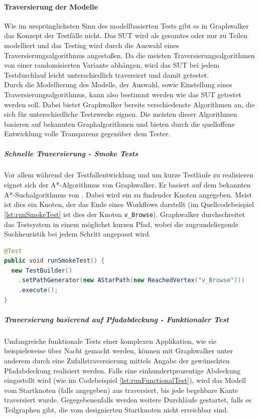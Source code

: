 \paragraph{Traversierung der Modelle} 
\label{sec:graphwalker_traversierung} 
Wie im ursprünglichsten Sinn des modellbasierten Tests gibt es in Graphwalker das Konzept der Testfälle nicht. Das \Gls{SUT} wird als gesamtes oder nur zu Teilen modelliert und das Testing wird durch die Auswahl eines Traversierungsalgorithmus angestoßen. Da die meisten Traversierungsalgorithmen von einer randomisierten Variante abhängen, wird das \Gls{SUT} bei jedem Testdurchlauf leicht unterschiedlich traversiert und damit getestet.\\
Durch die Modellierung des Modells, der Auswahl, sowie Einstellung eines Traversierungsalgorithmus, kann also bestimmt werden wie das \Gls{SUT} getestet werden soll. Dabei bietet Graphwalker bereits verschiedenste Algorithmen an, die sich für unterschiedliche Testzwecke eignen. Die meisten dieser Algorithmen basieren auf bekannten Graphalgorithmen und bieten durch die quelloffene Entwicklung volle Transparenz gegenüber dem Tester.

\subparagraph{Schnelle Traversierung - Smoke Tests}
Vor allem während der Testfallentwicklung und um kurze Testläufe zu realisieren eignet sich der A*-Algorithmus von Graphwalker. Er basiert auf dem bekannten A*-Suchalgorithmus von \citeauthor{hart_formal_1968} \cite{hart_formal_1968}. Dabei wird ein zu findender Knoten angegeben. Meist ist dies ein Knoten, der das Ende eines Workflows darstellt (im Quellcodebeispiel \ref{lst:runSmokeTest} ist dies der Knoten \texttt{v\_Browse}). Graphwalker durchschreitet das Testsystem in einem möglichst kurzen Pfad, wobei die zugrundeliegende Suchheuristik bei jedem Schritt angepasst wird.

\begin{lstlisting}[language=Java,caption={Initialisierung eines Graphwalker Tests basierend auf dem A*-Suchalgorithmus.}, label=lst:runSmokeTest]
@Test
public void runSmokeTest() {
  new TestBuilder()
    .setPathGenerator(new AStarPath(new ReachedVertex("v_Browse")))
    .execute();
}
\end{lstlisting}

\subparagraph{Traversierung basierend auf Pfadabdeckung - Funktionaler Test}
Umfangreiche funktionale Tests einer komplexen Applikation, wie sie beispielsweise über Nacht gemacht werden, können mit Graphwalker unter anderem durch eine Zufallstraversierung mittels Angabe der gewünschten Pfadabdeckung realisiert werden. Falls eine einhundertprozentige Abdeckung eingestellt wird (wie im Codebeispiel \ref{lst:runFunctionalTest}), wird das Modell vom Startknoten (falls angegeben) aus traversiert, bis jede begehbare Kante traversiert wurde. Gegegebenenfalls werden weitere Durchläufe gestartet, falls es Teilgraphen gibt, die vom designierten Startknoten nicht erreichbar sind. 

